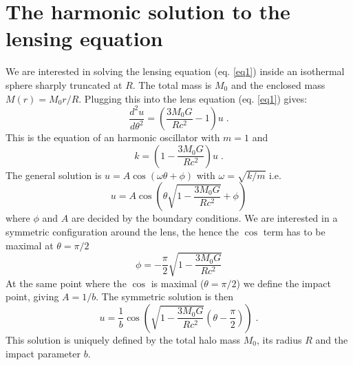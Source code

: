 \documentclass{article}
\begin{document}
\section{The harmonic solution to the lensing equation}

We are interested in solving the lensing equation (eq. \ref{eq1}) inside an isothermal sphere sharply truncated at $R$. The total mass is $M_0$ and the enclosed mass $M(r)=M_0r/R$. Plugging this into the lens equation (eq. \ref{eq1}) gives:
\begin{equation}
    \label{eq5}
    \frac{d^2u}{d\theta^2}=\left( \frac{3M_0G}{Rc^2} -1 \right) u \;.
\end{equation}
This is the equation of an harmonic oscillator with $m=1$ and
\begin{equation}
    \label{eq6}
    k=\left( 1-\frac{3M_0G}{Rc^2} \right) u \;.
\end{equation}
The general solution is $u=A\cos \left( \omega \theta+\phi \right)$ with $\omega=\sqrt{k/m}$ i.e.
\begin{equation}
    \label{eq7}
    u= A \cos \left( \theta\sqrt{1-\frac{3M_0G}{Rc^2}} +\phi \right)
\end{equation}
where $\phi$ and $A$ are decided by the boundary conditions. We are interested in a symmetric configuration around the lens, the hence the $\cos$ term has to be maximal at $\theta=\pi/2$ 
\begin{equation}
    \label{eq8}
    \phi = -\frac{\pi}{2}\sqrt{1-\frac{3M_0G}{Rc^2}}
\end{equation}
At the same point where the $\cos$ is maximal ($\theta=\pi/2$) we define the impact point, giving $A=1/b$. The symmetric solution is then 
\begin{equation}
    \label{eq9}
    u= \frac{1}{b} \cos \left( \sqrt{1-\frac{3M_0G}{Rc^2}} \left( \theta-\frac{\pi}{2}\right) \right)\;.
\end{equation}
This solution is uniquely defined by the total halo mass $M_0$, its radius $R$ and the impact parameter $b$.
\end{document}
